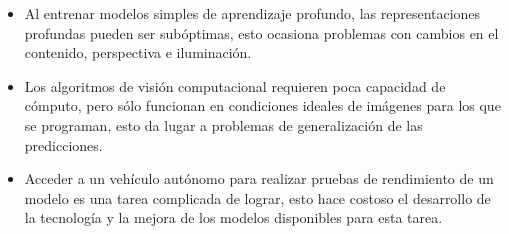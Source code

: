 \begin{itemize}[nosep]
	\item Al entrenar modelos simples de aprendizaje profundo, las representaciones profundas pueden ser subóptimas, esto ocasiona problemas con cambios en el contenido, perspectiva e iluminación.
	
	\item Los algoritmos de visión computacional requieren poca capacidad de cómputo, pero sólo funcionan en condiciones ideales de imágenes para los que se programan, esto da lugar a problemas de generalización de las predicciones.
	
	\item Acceder a un vehículo autónomo para realizar pruebas de rendimiento de un modelo es una tarea complicada de lograr, esto hace costoso el desarrollo de la tecnología y la mejora de los modelos disponibles para esta tarea.
\end{itemize}
